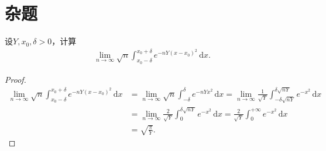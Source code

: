 \documentclass[../../main.tex]{subfiles}%
\begin{document}
\section{杂题}

\begin{example}
设$Y,x_0,\delta > 0$，计算
\begin{align*}
\lim_{n \to \infty} \sqrt{n} \int_{x_0 - \delta}^{x_0 + \delta} e^{-nY(x - x_0)^2} \,\mathrm{d}x.
\end{align*}
\end{example}
\begin{proof}

\begin{align*}
\underset{n\rightarrow \infty}{\lim}\sqrt{n}\int_{x_0-\delta}^{x_0+\delta}{e^{-nY(x-x_0)^2}\,\mathrm{d}x}&=\underset{n\rightarrow \infty}{\lim}\sqrt{n}\int_{-\delta}^{\delta}{e^{-nYx^2}\,\mathrm{d}x}=\underset{n\rightarrow \infty}{\lim}\frac{1}{\sqrt{Y}}\int_{-\delta \sqrt{nY}}^{\delta \sqrt{nY}}{e^{-x^2}\,\mathrm{d}x}
\\
&=\underset{n\rightarrow \infty}{\lim}\frac{2}{\sqrt{Y}}\int_0^{\delta \sqrt{nY}}{e^{-x^2}\,\mathrm{d}x}=\frac{2}{\sqrt{Y}}\int_0^{+\infty}{e^{-x^2}\,\mathrm{d}x}
\\
&=\sqrt{\frac{\pi}{Y}}.
\end{align*}

\end{proof}
\end{document}
